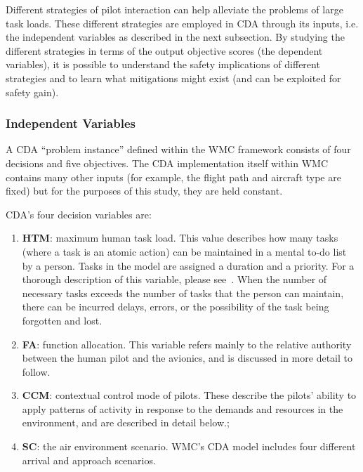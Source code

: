 \documentclass[journal]{IEEEtran}
\newenvironment{changed}{\par}{\par}
\begin{document}
Different strategies of pilot interaction can help alleviate the problems of large task loads.  These different strategies are employed in CDA through its inputs, i.e. the independent variables as described in the next subsection.  By studying the different strategies in terms of the output objective scores (the dependent variables), it is possible to understand the safety implications of different strategies and to learn what mitigations might exist (and can be exploited for safety gain).


\subsubsection{Independent Variables}

A CDA ``problem instance'' defined within the WMC framework consists of four decisions and five objectives.  
The CDA implementation itself within WMC contains many other inputs (for example, the flight path and aircraft type are fixed) but for the purposes of this study, they are held constant. 

CDA's four decision variables are:
\begin{changed}
\begin{enumerate}
\item \textbf{HTM}: maximum human task load. This value describes how many tasks (where a task is an atomic action) can be maintained in a mental to-do list by a person.  Tasks in the model are assigned a duration and a priority. For a thorough description of this variable, please see~\cite{Kim2011}. When the number of necessary tasks exceeds the number of tasks that the person can maintain, there can be incurred delays, errors, or the possibility of the task being forgotten and lost.
\item \textbf{FA}: function allocation.  This variable refers mainly to the relative authority between the human pilot and the avionics, and is discussed in more detail to follow.
\item \textbf{CCM}: contextual control mode of pilots. These describe the pilots' ability to apply patterns of activity in response to the demands and resources in the environment, and are described in detail below.;
\item \textbf{SC}: the  air environment  scenario.  WMC's CDA model includes four different arrival and approach scenarios.
\end{enumerate} 
\end{changed}
\end{document}
